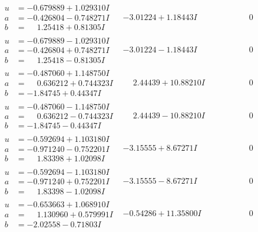 \documentclass[1p]{elsarticle_modified}
\theoremstyle{definition}
\begin{document}
$$\begin{array}{c|c|c}
\begin{aligned}
u &= -0.679889 + 1.029310 I \\
a &= -0.426804 - 0.748271 I \\
b &= \phantom{-}1.25418 + 0.81305 I\end{aligned}
 & -3.01224 + 1.18443 I & \phantom{-0.000000 } 0 \\ \hline\begin{aligned}
u &= -0.679889 - 1.029310 I \\
a &= -0.426804 + 0.748271 I \\
b &= \phantom{-}1.25418 - 0.81305 I\end{aligned}
 & -3.01224 - 1.18443 I & \phantom{-0.000000 } 0 \\ \hline\begin{aligned}
u &= -0.487060 + 1.148750 I \\
a &= \phantom{-}0.636212 + 0.744323 I \\
b &= -1.84745 + 0.44347 I\end{aligned}
 & \phantom{-}2.44439 + 10.88210 I & \phantom{-0.000000 } 0 \\ \hline\begin{aligned}
u &= -0.487060 - 1.148750 I \\
a &= \phantom{-}0.636212 - 0.744323 I \\
b &= -1.84745 - 0.44347 I\end{aligned}
 & \phantom{-}2.44439 - 10.88210 I & \phantom{-0.000000 } 0 \\ \hline\begin{aligned}
u &= -0.592694 + 1.103180 I \\
a &= -0.971240 - 0.752201 I \\
b &= \phantom{-}1.83398 + 1.02098 I\end{aligned}
 & -3.15555 + 8.67271 I & \phantom{-0.000000 } 0 \\ \hline\begin{aligned}
u &= -0.592694 - 1.103180 I \\
a &= -0.971240 + 0.752201 I \\
b &= \phantom{-}1.83398 - 1.02098 I\end{aligned}
 & -3.15555 - 8.67271 I & \phantom{-0.000000 } 0 \\ \hline\begin{aligned}
u &= -0.653663 + 1.068910 I \\
a &= \phantom{-}1.130960 + 0.579991 I \\
b &= -2.02558 - 0.71803 I\end{aligned}
 & -0.54286 + 11.35800 I & \phantom{-0.000000 } 0 \\ \hline\begin{aligned}

\end{aligned}
\end{array}$$
\end{document}
